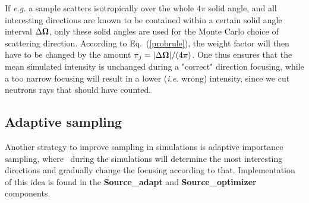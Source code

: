 If {\em e.g.} a sample scatters isotropically
over the whole $4\pi$ solid angle, and all interesting
directions are known to be contained within a certain
solid angle interval $\Delta \mbox{\boldmath $\Omega$}$, only these solid angles
are used for the Monte Carlo choice of scattering direction.
According to Eq.~(\ref{probrule}), the weight factor will then have
to be changed by the amount
$\pi_j = |\Delta \mbox{\boldmath $\Omega$}| / (4 \pi)$.
One thus ensures that the mean simulated intensity is unchanged
during a "correct" direction focusing, while a too narrow focusing will
result in a lower (\textit{i.e.} wrong) intensity, since 
we cut neutrons rays that should have counted.

\subsection{Adaptive sampling}
Another strategy to improve sampling in simulations
is adaptive importance sampling, %
where \MCS\ during the simulations will determine
the most interesting directions and gradually change
the focusing according to that. 
Implementation of this idea is
found in the {\bf Source\_adapt} and {\bf Source\_optimizer} components.
